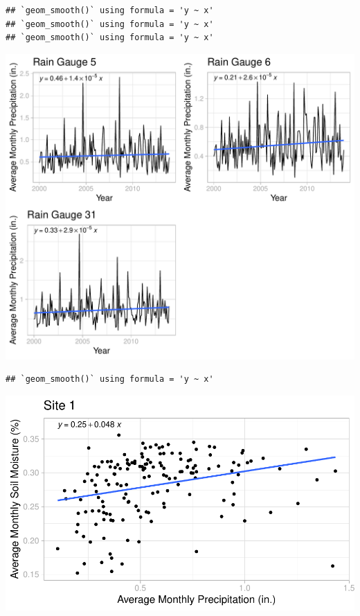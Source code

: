 \documentclass[
  12pt,
]{article}
\begin{document}
\begin{verbatim}
## `geom_smooth()` using formula = 'y ~ x'
## `geom_smooth()` using formula = 'y ~ x'
## `geom_smooth()` using formula = 'y ~ x'
\end{verbatim}

\includegraphics{Project_Template_files/figure-latex/Average Monthly Precipitation Cowplot-1.pdf}

\begin{verbatim}
## `geom_smooth()` using formula = 'y ~ x'
\end{verbatim}

\includegraphics{Project_Template_files/figure-latex/Average Monthly Soil Moisture and Precipitation Plots-1.pdf}
\end{document}
